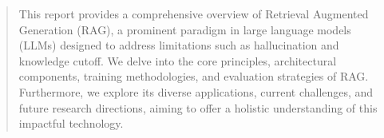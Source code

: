\begin{abstract}
    \raggedright
    This report provides a comprehensive overview of Retrieval Augmented Generation (RAG), a prominent paradigm in large language models (LLMs) designed to address limitations such as hallucination and knowledge cutoff. We delve into the core principles, architectural components, training methodologies, and evaluation strategies of RAG. Furthermore, we explore its diverse applications, current challenges, and future research directions, aiming to offer a holistic understanding of this impactful technology.
\end{abstract}